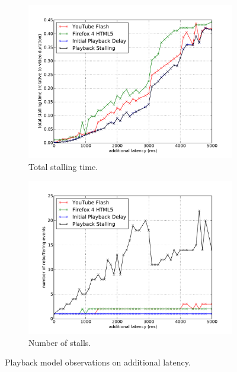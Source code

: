 \begin{figure}[htbp]
	\centering
    	\begin{subfigure}[b]{1.0\textwidth}
            \centering
            \includegraphics[width=\textwidth]{images/eval-latency-stallingtime.pdf}
            \caption{Total stalling time.}
            \label{c3:fig:eval-latency-stallingtime}
        \end{subfigure}

    	\begin{subfigure}[b]{1.0\textwidth}
            \centering
            \includegraphics[width=\textwidth]{images/eval-latency-frequency.pdf}
            \caption{Number of stalls.}
            \label{c3:fig:eval-latency-numstalls}
        \end{subfigure}
	\caption{Playback model observations on additional latency.}
	\label{c3:fig:eval-latency}
\end{figure}


